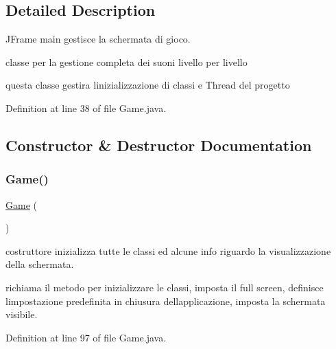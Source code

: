 \subsection{Detailed Description}
J\+Frame main gestisce la schermata di gioco. 

classe per la gestione completa dei suoni livello per livello

questa classe gestira l\textquotesingle{}inizializzazione di classi e Thread del progetto 

Definition at line 38 of file Game.\+java.



\subsection{Constructor \& Destructor Documentation}
\mbox{\label{classprogetto_1_1_game_a98d87ba6bde3f389e92664a2ef9bfcb1}} 
\subsubsection{\texorpdfstring{Game()}{Game()}}
{\footnotesize\ttfamily \hyperlink{classprogetto_1_1_game}{Game} (\begin{DoxyParamCaption}{ }\end{DoxyParamCaption})}



costruttore inizializza tutte le classi ed alcune info riguardo la visualizzazione della schermata. 

richiama il metodo per inizializzare le classi, imposta il full screen, definisce l\textquotesingle{}impostazione predefinita in chiusura dell\textquotesingle{}applicazione, imposta la schermata visibile. 

Definition at line 97 of file Game.\+java.


